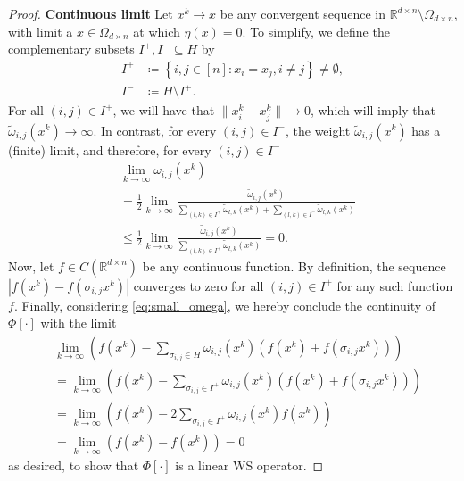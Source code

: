 \documentclass[10pt,a4paper]{amsart}
\newcommand{\RR}{\mathbb{R}}
\newcommand{\abs}[1]{\left\lvert#1\right\rvert}
\begin{document}
\begin{proof}
	\textbf{Continuous limit}
    Let $x^k \to x$ be any convergent sequence in $\RR^{d \times n} \setminus{\Omega_{d \times n}}$, with limit a $x \in \Omega_{d \times n}$ at which $\eta(x) = 0$. 
    To simplify, we define the complementary subsets $I^+ ,I^- \subseteq H$ by
    \begin{equation}
    \begin{split}
        I^+ &\coloneq \left\{i, j \in [n]: x_i = x_j, i \ne j \right\} \ne \emptyset, \\
        I^- &\coloneq H \setminus{I^+}.
    \end{split}
    \end{equation}
For all $(i,j)\in I^+$, we will have that $\|x_i^k-x_j^k\| \rightarrow 0 $, which will imply that $\tilde\omega_{i,j}(x^k)\rightarrow \infty $. In contrast, for every $(i, j) \in I^-$, the weight $ \tilde\omega_{i,j}(x^k) $ has a (finite) limit, and therefore, for every $(i, j) \in I^-$
\begin{equation}\label{eq:small_omega}
\begin{split}
    &\lim_{k \to \infty}{\omega_{i,j}(x^k)} \\  &= 
 \frac{1}{2} \lim_{k \to \infty}{
\frac{\tilde{\omega}_{i,j}(x^k)}{\sum_{(l, k) \in I^+}{\tilde{\omega}_{l,k}(x^k)}  + \sum_{(l, k) \in I^-}{\tilde{\omega}_{l,k}(x^k)}
} 
} \\ &\leq
 \frac{1}{2} \lim_{k \to \infty}{
\frac{\tilde{\omega}_{i,j}(x^k)}{\sum_{(l, k) \in I^+}{\tilde{\omega}_{l,k}(x^k)}
} 
} = 0.
\end{split}
\end{equation}
Now, let $f \in C(\RR^{d \times n})$ be any continuous function. By definition, the sequence $\abs{f(x^k) - f(\sigma_{i, j} x^k)}$ converges to zero for all $(i, j) \in I^+$ for any such function $f$. Finally, considering \eqref{eq:small_omega}, we hereby conclude the continuity of $\Phi[\cdot]$ with the limit
\begin{equation}
\begin{split}
     &\lim_{k \to \infty}{\left(
f(x^k) - \sum_{\sigma_{i,j} \in H}{\omega_{i,j}(x^k)\left(f(x^k) + f(\sigma_{i, j} x^k) \right)}
\right)} \\ &= 
\lim_{k \to \infty}{\left(
f(x^k) - \sum_{\sigma_{i,j} \in I^+}{\omega_{i,j}(x^k)\left(f(x^k) + f(\sigma_{i, j} x^k) \right)}
\right)}
\\ &= 
\lim_{k \to \infty}{\left(
f(x^k) - 2\sum_{\sigma_{i,j} \in I^+}{\omega_{i,j}(x^k)f(x^k)}
\right)} \\
&= \lim_{k \to \infty}{\left(f(x^k) - f(x^k) \right)} = 0
\end{split}
\end{equation}
as desired, to show that $\Phi[\cdot]$ is a linear WS operator.
\end{proof}
\end{document}
